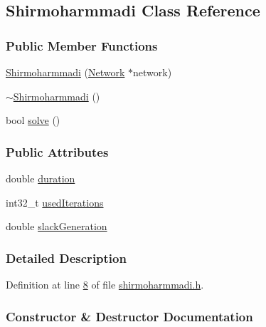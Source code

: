 \hypertarget{class_shirmoharmmadi}{}\subsection{Shirmoharmmadi Class Reference}
\label{class_shirmoharmmadi}
\subsubsection*{Public Member Functions}
\begin{DoxyCompactItemize}
\item 
\hyperlink{class_shirmoharmmadi_aa5833386f9b43019a318c81a3006e2b1}{Shirmoharmmadi} (\hyperlink{class_network}{Network} $\ast$network)
\item 
\hyperlink{class_shirmoharmmadi_ac89016d70d3c99339af11f3b6f1f23b2}{$\sim$\+Shirmoharmmadi} ()
\item 
bool \hyperlink{class_shirmoharmmadi_acb4a06c62b5d97c25bea70acd477e715}{solve} ()
\end{DoxyCompactItemize}
\subsubsection*{Public Attributes}
\begin{DoxyCompactItemize}
\item 
double \hyperlink{class_shirmoharmmadi_a32ab19ff485833106bf68cd91dbc94e6}{duration}
\item 
int32\+\_\+t \hyperlink{class_shirmoharmmadi_afdd22da0145b033c47f4f8a6bbd37d0d}{used\+Iterations}
\item 
double \hyperlink{class_shirmoharmmadi_aeb47da6439c2e92c7ebcc59ebb71624b}{slack\+Generation}
\end{DoxyCompactItemize}


\subsubsection{Detailed Description}


Definition at line \hyperlink{shirmoharmmadi_8h_source_l00008}{8} of file \hyperlink{shirmoharmmadi_8h_source}{shirmoharmmadi.\+h}.



\subsubsection{Constructor \& Destructor Documentation}
\hypertarget{class_shirmoharmmadi_aa5833386f9b43019a318c81a3006e2b1}{}
